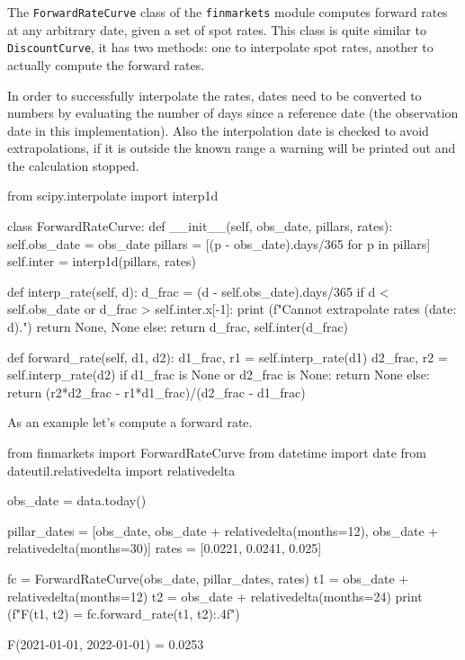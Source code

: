 \begin{finmarkets}
The \texttt{ForwardRateCurve} class of the \texttt{finmarkets} module computes forward rates at any arbitrary date, given a set of spot rates. This class is quite similar to \texttt{DiscountCurve}, it has two methods: one to interpolate spot rates, another to actually compute the forward rates.

In order to successfully interpolate the rates, dates need to be converted to numbers by evaluating the number of days since a reference date (the observation date in this implementation). Also the interpolation date is checked to avoid extrapolations, if it is outside the known range a warning will be printed out and the calculation stopped.
\end{finmarkets}

\begin{ipython}
from scipy.interpolate import interp1d

class ForwardRateCurve:
    def __init__(self, obs_date, pillars, rates):
        self.obs_date = obs_date
        pillars = [(p - obs_date).days/365 for p in pillars]
        self.inter = interp1d(pillars, rates)

    def interp_rate(self, d):
        d_frac = (d - self.obs_date).days/365
        if d < self.obs_date or d_frac > self.inter.x[-1]:
            print (f"Cannot extrapolate rates (date: {d}).")
            return None, None
        else:
            return d_frac, self.inter(d_frac)

    def forward_rate(self, d1, d2):
        d1_frac, r1 = self.interp_rate(d1)
        d2_frac, r2 = self.interp_rate(d2)
        if d1_frac is None or d2_frac is None:
            return None
        else:
            return (r2*d2_frac - r1*d1_frac)/(d2_frac - d1_frac)
\end{ipython}

As an example let's compute a forward rate.
\begin{ipython}
from finmarkets import ForwardRateCurve
from datetime import date
from dateutil.relativedelta import relativedelta

obs_date = data.today()

pillar_dates = [obs_date,
                obs_date + relativedelta(months=12),
                obs_date + relativedelta(months=30)]
rates = [0.0221, 0.0241, 0.025]

fc = ForwardRateCurve(obs_date, pillar_dates, rates)
t1 = obs_date + relativedelta(months=12)
t2 = obs_date + relativedelta(months=24)
print (f"F({t1}, {t2}) = {fc.forward_rate(t1, t2):.4f}")
\end{ipython}
\begin{ioutput}
F(2021-01-01, 2022-01-01) = 0.0253
\end{ioutput}

